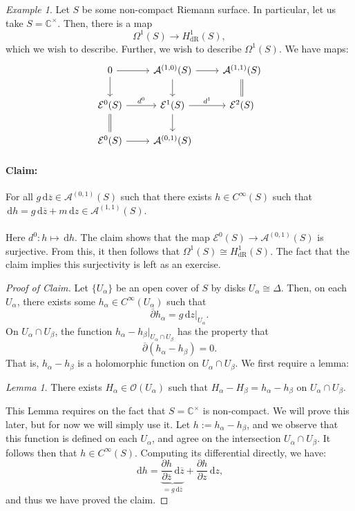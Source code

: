 \documentclass[a4paper]{report}
\theoremstyle{definition}
\theoremstyle{remark}
\theoremstyle{proposition}
\theoremstyle{conjecture}
\theoremstyle{lemma}
\newtheorem{lemma}{Lemma}
\theoremstyle{corollary}
\theoremstyle{exercise}
\theoremstyle{example}
\newtheorem{example}{Example}
\newcommand{\C}{\mathbb{C}}
\newcommand{\mcal}{\mathcal}
\newcommand{\diff}{\,\mathrm{d}}
\newcommand{\on}{\operatorname}
\begin{document}
\begin{example}
    Let $S$ be some non-compact Riemann surface. In particular, let us take 
    $S = \C^\times$. Then, there is a map 
    $$\Omega^1(S) \longrightarrow H^1_{\on{dR}}(S),$$
    which we wish to describe. Further, we wish to describe $\Omega^1(S)$.
    We have maps:
    $$\begin{tikzcd}
    0 \arrow[r] \arrow[d]                                         & {\mcal{A}^{(1,0)}(S)} \arrow[r] \arrow[d] & {\mcal{A}^{(1,1)}(S)} \arrow[d, no head, equal] \\
    \mcal{E}^0(S) \arrow[r, "d^0"] \arrow[d, no head, equal] & \mcal{E}^1(S) \arrow[r, "d^1"] \arrow[d]  & \mcal{E}^2(S)                                        \\
    \mcal{E}^0(S) \arrow[r]                                       & {\mcal{A}^{(0,1)}(S)}                     &
    \end{tikzcd}$$
    \paragraph{Claim:} For all $g\diff \overline{z} \in \mcal{A}^{(0,1)}(S)$ such that 
    there exists $h\in C^\infty(S)$ such that $\diff h = g \diff\overline{z} + m\diff z \in \mcal{A}^{(1,1)}(S).$ \\\\
    Here $d^0 : h \mapsto \diff h$.
    The claim shows that the map $\mcal{E}^0(S) \to \mcal{A}^{(0,1)}(S)$ 
    is surjective. From this, it then follows that $\Omega^1(S) \cong H^1_{\on{dR}}(S)$.
    The fact that the claim implies this surjectivity is left as an exercise.
    \begin{proof}[Proof of Claim]
        Let $\lbrace U_\alpha\rbrace$ be an open cover of $S$ by disks
        $U_\alpha \cong \Delta$. Then, on each $U_\alpha$, there 
        exists some $h_\alpha \in C^\infty(U_\alpha)$ such that 
        $$\overline{\partial}h_\alpha = g\diff z\vert_{U_\alpha}.$$
        On $U_\alpha \cap U_\beta$, the function 
        $h_\alpha - h_\beta\vert_{U_\alpha \cap U_\beta}$ has the property that 
        $$\overline{\partial}(h_\alpha - h_\beta ) = 0.$$
        That is, $h_\alpha - h_\beta$ is a holomorphic function on 
        $U_\alpha \cap U_\beta$. We first require a lemma:
        \begin{lemma}
            There exists $H_\alpha \in \mcal{O}(U_\alpha)$  such that
            $H_\alpha - H_\beta = h_\alpha - h_\beta$ on $U_\alpha\cap U_\beta$.
        \end{lemma}
        This Lemma requires on the fact that $S=\C^\times$ is non-compact.
        We will prove this later, but for now we will simply use it.
        Let $h := h_\alpha-h_\beta$, and we observe that this function 
        is defined on each $U_\alpha$, and agree on the intersection
        $U_\alpha\cap U_\beta$. It follows then that 
        $h \in C^\infty(S)$. Computing its differential directly, we have:
        $$\diff h = \underbrace{\frac{\partial h}{\partial \overline{z}} \diff \overline{z}}_{=g\diff\overline{z}} + \frac{\partial h}{\partial z}\diff z,$$
        and thus we have proved the claim.
    \end{proof}
\end{example}
\end{document}
